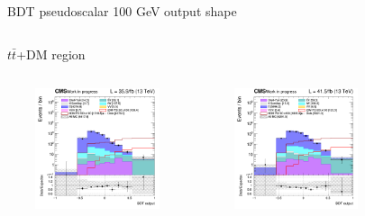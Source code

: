 \documentclass[8pt]{beamer}
\begin{document}
\begin{frame}{BDT pseudoscalar 100 GeV output shape}
\vspace{-8pt}
\begin{columns}
\begin{column}{1.09\textwidth}
\begin{block}{\centering $t \bar t$+DM region}\end{block} \vspace{10pt}
\end{column}
\end{columns} \vspace{-16pt}
\begin{columns}
		\begin{column}{0.33\textwidth}
			\begin{center}
     			\includegraphics[width=1.0\textwidth, height=100pt]{figs/2016/SmearSR-ttDM-pseudo100/log_cratio_TTbar_topCR_ll_BDT_ttDM100_TTbar_BDT_output_pseudoscalar100_customBinsAttempt7.png}
    		\end{center}		
		\end{column}
		\begin{column}{0.33\textwidth}
			\begin{center}
     			\includegraphics[width=1.0\textwidth, height=100pt]{figs/2017/SmearSR-ttDM-pseudo100/log_cratio_TTbar_topCR_ll_BDT_ttDM100_TTbar_BDT_output_pseudoscalar100_customBinsAttempt7.png}
    		\end{center}		
		\end{column}
		\begin{column}{0.33\textwidth}
			\begin{center}

\end{center}
\end{column}
\end{columns}
\end{frame}
\end{document}
